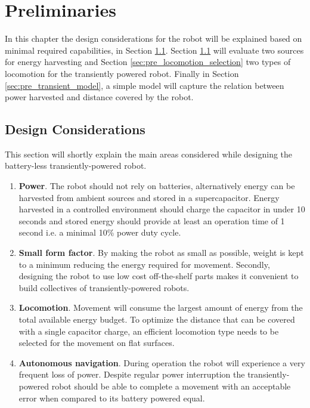 \chapter{Preliminaries}
\label{chp:preliminaries}

In this chapter the design considerations for the robot will be explained based on minimal required capabilities, in Section \ref{sec:pre_design_considerations}.
Section \ref{sec:pre_design_considerations} will evaluate two sources for energy harvesting and Section \ref{sec:pre_locomotion_selection} two types of locomotion for the transiently powered robot.
Finally in Section \ref{sec:pre_transient_model}, a simple model will capture the relation between power harvested and distance covered by the robot.

\section{Design Considerations}
\label{sec:pre_design_considerations}

This section will shortly explain the main areas considered while designing the battery-less transiently-powered robot.

\begin{enumerate}
	\item \textbf{Power}. 
	The robot should not rely on batteries, alternatively energy can be harvested from ambient sources and stored in a supercapacitor. 
	Energy harvested in a controlled environment should charge the capacitor in under 10 seconds and stored energy should provide at least an operation time of 1 second i.e. a minimal 10\% power duty cycle.
	
	\item \textbf{Small form factor}. 
	By making the robot as small as possible, weight is kept to a minimum reducing the energy required for movement.
	Secondly, designing the robot to use low cost off-the-shelf parts makes it convenient to build collectives of transiently-powered robots.
	
	\item \textbf{Locomotion}.
	Movement will consume the largest amount of energy from the total available energy budget.
	To optimize the distance that can be covered with a single capacitor charge, an efficient locomotion type needs to be selected for the movement on flat surfaces.
	
	\item \textbf{Autonomous navigation}.
	During operation the robot will experience a very frequent loss of power. 
	Despite regular power interruption the transiently-powered robot should be able to complete a movement with an acceptable error when compared to its battery powered equal.
	
\end{enumerate}

